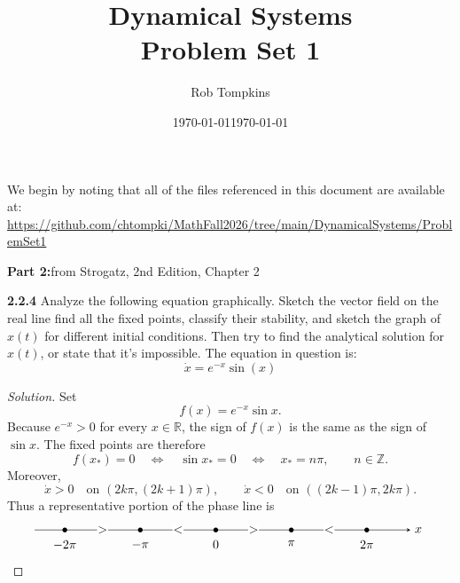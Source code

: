 \documentclass[10pt]{amsart}
\title{Dynamical Systems\\Problem Set 1}
\author{Rob Tompkins}
\date{\today}
\newenvironment{solution}
{\begin{proof}[Solution]}
{\end{proof}}
\begin{document}
    \maketitle
    \date{\today}
    \begin{onehalfspace}
        We begin by noting that all of the files referenced in this document are available at: \\
        \underline{https://github.com/chtompki/MathFall2026/tree/main/DynamicalSystems/ProblemSet1}

        \vspace{0.45em}
        {\noindent\bfseries\large Part 2:}\quad from Strogatz, 2nd Edition, Chapter 2

        \noindent\textbf{2.2.4} Analyze the following equation graphically.
        Sketch the vector field on the real line find all the fixed points, classify their
        stability, and sketch the graph of $x(t)$ for different initial conditions.
        Then try to find the analytical solution for $x(t)$, or state that it's impossible.
        The equation in question is:
        \[
            \dot{x} = e^{-x}\sin(x)
        \]

        \begin{solution}
            Set
            \[
                f(x)=e^{-x}\sin x.
            \]
            Because $e^{-x}>0$ for every $x\in\mathbb R$, the sign of $f(x)$ is the
            same as the sign of $\sin x$. The fixed points are therefore
            \[
                f(x_*)=0
                \quad\Longleftrightarrow\quad
                \sin x_*=0
                \quad\Longleftrightarrow\quad
                \boxed{x_*=n\pi,\qquad n\in\mathbb Z.}
            \]
            Moreover,
            \[
                \dot{x}>0 \quad\text{on }(2k\pi,(2k+1)\pi),
                \qquad
                \dot{x}<0 \quad\text{on }((2k-1)\pi,2k\pi).
            \]
            Thus a representative portion of the phase line is
            \[
                \begin{tikzpicture}[baseline=-0.5ex,>=stealth,scale=0.95]
                  \draw[->] (-5.4,0)--(5.8,0) node[right] {$x$};
                  \foreach \x/\lab in {-4.5/$-2\pi$,-2.25/$-\pi$,0/$0$,2.25/$\pi$,4.5/$2\pi$}{
                      \fill (\x,0) circle (2pt);
                      \node[below=5pt] at (\x,0) {\lab};
                  }

                  \node[fill=white,inner sep=0.5pt] at (-3.375,0) {$>$};
                  \node[fill=white,inner sep=0.5pt] at (-1.125,0) {$<$};
                  \node[fill=white,inner sep=0.5pt] at ( 1.125,0) {$>$};
                  \node[fill=white,inner sep=0.5pt] at ( 3.375,0) {$<$};



\end{tikzpicture}\]
\end{solution}
\end{onehalfspace}
\end{document}
